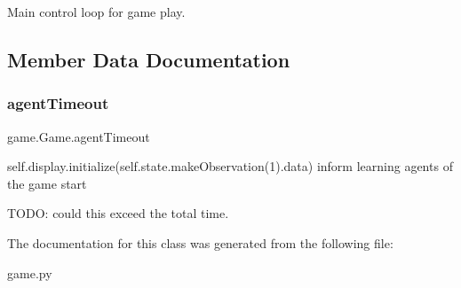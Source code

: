 \begin{DoxyVerb}Main control loop for game play.
\end{DoxyVerb}
 

\subsection{Member Data Documentation}
\mbox{\label{classgame_1_1_game_a269239dbb1e058565244d278b9ba460f}} 
\subsubsection{\texorpdfstring{agent\+Timeout}{agentTimeout}}
{\footnotesize\ttfamily game.\+Game.\+agent\+Timeout}



self.\+display.\+initialize(self.\+state.\+make\+Observation(1).data) inform learning agents of the game start 

T\+O\+DO\+: could this exceed the total time. 

The documentation for this class was generated from the following file\+:\begin{DoxyCompactItemize}
\item 
game.\+py\end{DoxyCompactItemize}
